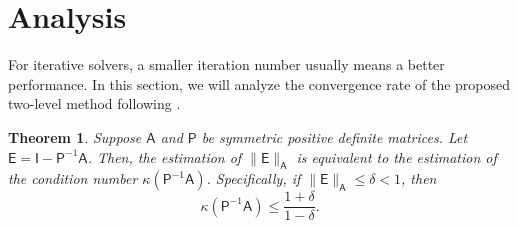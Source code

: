 \documentclass[preprint,12pt]{elsarticle}
\newtheorem{theorem}{Theorem}
\begin{document}

  \section{Analysis}
  \label{sec:anal}

  For iterative solvers, a smaller iteration number usually means a better performance.
  In this section, we will analyze the convergence rate of the proposed two-level
  method following \cite{xu2017algebraic}.

  \begin{theorem}
    \label{thm:condition} Suppose $\mathsf{A}$ and $\mathsf{P}$ be symmetric positive
    definite matrices. Let $\mathsf{E}= \mathsf{I}- \mathsf{P}^{-1}\mathsf{A}$. Then,
    the estimation of $\|\mathsf{E}\|_{\mathsf{A}}$ is equivalent to the
    estimation of the condition number $\kappa(\mathsf{P}^{-1}\mathsf{A})$. Specifically,
    if $\|\mathsf{E}\|_{\mathsf{A}}\le \delta < 1$, then
    \[
      \kappa(\mathsf{P}^{-1}\mathsf{A}) \le \frac{1+\delta}{1-\delta}.
    \]
  \end{theorem}
\end{document}
